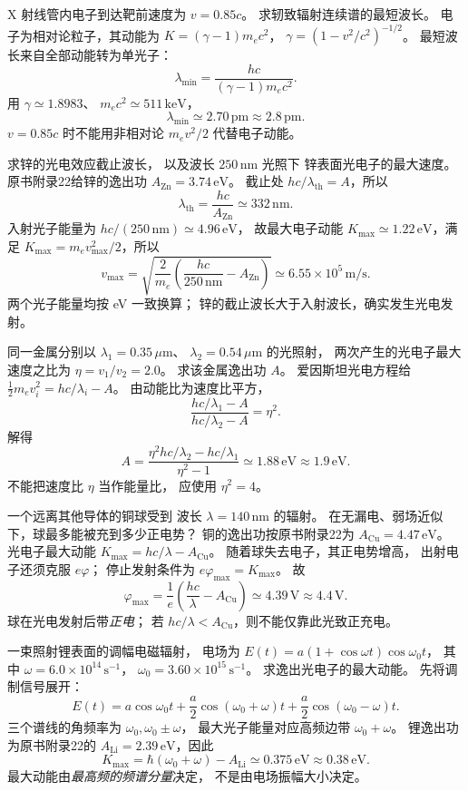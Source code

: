 X 射线管内电子到达靶前速度为 $v=0.85c$。
求轫致辐射连续谱的最短波长。
\exsolution
电子为相对论粒子，其动能为
$K=(\gamma-1)m_ec^2$，
$\gamma=(1-v^2/c^2)^{-1/2}$。
最短波长来自全部动能转为单光子：
\[
 \boxed{\lambda_{\min}=
 \frac{hc}{(\gamma-1)m_ec^2}}.
\]
用 $\gamma\simeq1.8983$、
$m_ec^2\simeq511\,\mathrm{keV}$，
\[
 \boxed{\lambda_{\min}\simeq2.70\,\mathrm{pm}
 \approx2.8\,\mathrm{pm}}.
\]
\excheck $v=0.85c$ 时不能用非相对论
$m_ev^2/2$ 代替电子动能。

求锌的光电效应截止波长，
以及波长 $250\,\mathrm{nm}$ 光照下
锌表面光电子的最大速度。
\exsolution
原书附录22给锌的逸出功
$A_{\mathrm{Zn}}=3.74\,\mathrm{eV}$。
截止处 $hc/\lambda_{\mathrm{th}}=A$，所以
\[
 \boxed{\lambda_{\mathrm{th}}=
 \frac{hc}{A_{\mathrm{Zn}}}\simeq332\,\mathrm{nm}}.
\]
入射光子能量为
$hc/(250\,\mathrm{nm})\simeq4.96\,\mathrm{eV}$，
故最大电子动能
$K_{\max}\simeq1.22\,\mathrm{eV}$，满足
$K_{\max}=m_ev_{\max}^2/2$，所以
\[
 \boxed{v_{\max}=
 \sqrt{\frac{2}{m_e}
 \left(\frac{hc}{250\,\mathrm{nm}}-A_{\mathrm{Zn}}\right)}
 \simeq6.55\times10^5\,\mathrm{m/s}}.
\]
\excheck 两个光子能量均按 eV 一致换算；
锌的截止波长大于入射波长，确实发生光电发射。

同一金属分别以
$\lambda_1=0.35\,\mu\mathrm m$、
$\lambda_2=0.54\,\mu\mathrm m$ 的光照射，
两次产生的光电子最大速度之比为
$\eta=v_1/v_2=2.0$。
求该金属逸出功 $A$。
\exsolution
爱因斯坦光电方程给
$\tfrac12m_ev_i^2=hc/\lambda_i-A$。
由动能比为速度比平方，
\[
 \frac{hc/\lambda_1-A}
 {hc/\lambda_2-A}=\eta^2.
\]
解得
\[
 \boxed{A=
 \frac{\eta^2hc/\lambda_2-hc/\lambda_1}
 {\eta^2-1}
 \simeq1.88\,\mathrm{eV}\approx1.9\,\mathrm{eV}}.
\]
\excheck 不能把速度比 $\eta$ 当作能量比，
应使用 $\eta^2=4$。

一个远离其他导体的铜球受到
波长 $\lambda=140\,\mathrm{nm}$ 的辐射。
在无漏电、弱场近似下，球最多能被充到多少正电势？
\exsolution
铜的逸出功按原书附录22为
$A_{\mathrm{Cu}}=4.47\,\mathrm{eV}$。
光电子最大动能
$K_{\max}=hc/\lambda-A_{\mathrm{Cu}}$。
随着球失去电子，其正电势增高，
出射电子还须克服 $e\varphi$；
停止发射条件为 $e\varphi_{\max}=K_{\max}$。
故
\[
 \boxed{\varphi_{\max}=
 \frac1e\left(\frac{hc}{\lambda}-A_{\mathrm{Cu}}\right)
 \simeq4.39\,\mathrm V\approx4.4\,\mathrm V}.
\]
\excheck 球在光电发射后带\emph{正电}；
若 $hc/\lambda<A_{\mathrm{Cu}}$，则不能仅靠此光致正充电。

一束照射锂表面的调幅电磁辐射，
电场为
$E(t)=a(1+\cos\omega t)\cos\omega_0t$，
其中 $\omega=6.0\times10^{14}\,\mathrm{s^{-1}}$，
$\omega_0=3.60\times10^{15}\,\mathrm{s^{-1}}$。
求逸出光电子的最大动能。
\exsolution
先将调制信号展开：
\[
 E(t)=a\cos\omega_0t+
 \frac a2\cos(\omega_0+\omega)t+
 \frac a2\cos(\omega_0-\omega)t.
\]
三个谱线的角频率为
$\omega_0,\omega_0\pm\omega$，
最大光子能量对应高频边带 $\omega_0+\omega$。
锂逸出功为原书附录22的
$A_{\mathrm{Li}}=2.39\,\mathrm{eV}$，因此
\[
 \boxed{K_{\max}=
 \hbar(\omega_0+\omega)-A_{\mathrm{Li}}
 \simeq0.375\,\mathrm{eV}\approx0.38\,\mathrm{eV}}.
\]
\excheck 最大动能由\emph{最高频的频谱分量}决定，
不是由电场振幅大小决定。


